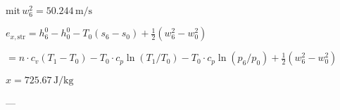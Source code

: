 \( \text{mit} \, w_6^2 = 50.244 \, \text{m/s} \)  

\( e_{x,\text{str}} = h_6^0 - h_0^0 - T_0 (s_6 - s_0) + \frac{1}{2} (w_6^2 - w_0^2) \)  

\( = n \cdot c_v (T_1 - T_0) - T_0 \cdot c_p \ln (T_1 / T_0) - T_0 \cdot c_p \ln (p_6 / p_0) + \frac{1}{2} (w_6^2 - w_0^2) \)  

\( x = 725.67 \, \text{J/kg} \)  

---